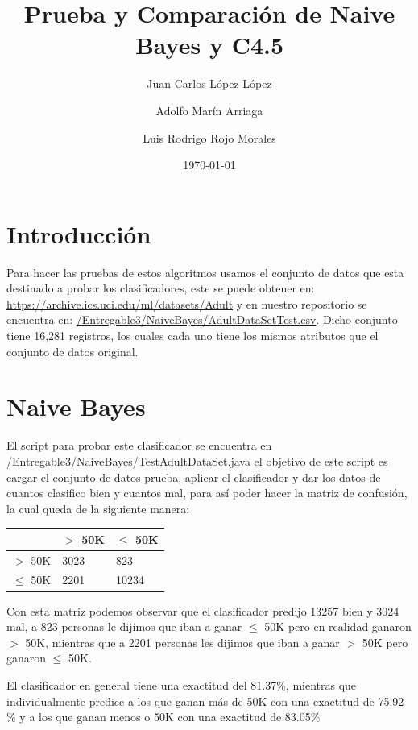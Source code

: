 \documentclass{article}
\title{Prueba y Comparación de Naive Bayes y C4.5}
\author{Juan Carlos López López \and Adolfo Marín Arriaga \and Luis Rodrigo Rojo Morales}
\date{\today\\}
\begin{document}
 \maketitle
 \section{Introducción}
 Para hacer las pruebas de estos algoritmos usamos el conjunto de datos que esta destinado a probar los clasificadores, este se puede obtener en: \href{https://archive.ics.uci.edu/ml/datasets/Adult} {https://archive.ics.uci.edu/ml/datasets/Adult} y en nuestro repositorio se encuentra en: \href{https://github.com/rodrigorojo/ProyectoFinalMineria/blob/master/Entregable3/NaiveBayes/AdultDataSetTest.csv}{/Entregable3/NaiveBayes/AdultDataSetTest.csv}. Dicho conjunto tiene 16,281 registros, los cuales cada uno tiene los mismos atributos que el conjunto de datos original.

 \section{Naive Bayes}
 El script para probar este clasificador se encuentra en \href{https://github.com/rodrigorojo/ProyectoFinalMineria/blob/master/Entregable3/NaiveBayes/TestAdultDataSet.java} {/Entregable3/NaiveBayes/TestAdultDataSet.java} el objetivo de este script es cargar el conjunto de datos prueba, aplicar el clasificador y dar los datos de cuantos clasifico bien y cuantos mal, para así poder hacer la matriz de confusión, la cual queda de la siguiente manera:
 \begin{center}
   \begin{tabular}{|p{2cm}|p{2cm}|p{2cm}|}
     \hline
                  & $>$ 50K & $\leq$ 50K  \\ \hline
      $>$ 50K     & 3023 & 823 \\ \hline
      $\leq$ 50K  & 2201 & 10234 \\ \hline
    \end{tabular}
 \end{center}
 Con esta matriz podemos observar que el clasificador predijo 13257 bien y 3024 mal, a 823 personas le dijimos que iban a ganar $\leq$ 50K pero en realidad ganaron $>$ 50K, mientras que a 2201 personas les dijimos que iban a ganar $>$ 50K pero ganaron $\leq$ 50K.

 El clasificador en general tiene una exactitud del 81.37$\%$, mientras que individualmente predice a los que ganan más de 50K con una exactitud de 75.92$\%$ y a los que ganan menos o 50K con una exactitud de 83.05$\%$
\end{document}
